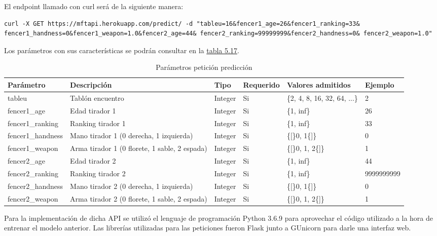 El endpoint llamado con curl será de la siguiente manera:

\begin{lstlisting}
curl -X GET https://mftapi.herokuapp.com/predict/ -d "tableu=16&fencer1_age=26&fencer1_ranking=33& fencer1_handness=0&fencer1_weapon=1.0&fencer2_age=44& fencer2_ranking=99999999&fencer2_handness=0& fencer2_weapon=1.0"
\end{lstlisting}

Los parámetros con sus características se podrán consultar en la \hyperref[tab:Parmetros peticion prediccion]{tabla 5.17}.


\begin{longtable}{llllll}
	\caption{Parámetros petición predicción}
	\label{tab:Parmetros peticion prediccion}

  \endfirsthead
  \endhead
  Parámetro & Descripción & Tipo & Requerido & Valores admitidos & Ejemplo \\ \hline
  \multicolumn{1}{l|}{tableu} & \multicolumn{1}{l|}{Tablón encuentro} & Integer & Si & \{2, 4, 8, 16, 32, 64, ...\} & 2 \\ \hline
  \multicolumn{1}{l|}{fencer1\_age} & \multicolumn{1}{l|}{Edad tirador 1} & Integer & Si & \{1, inf\} & 26 \\
  \multicolumn{1}{l|}{fencer1\_ranking} & \multicolumn{1}{l|}{Ranking tirador 1} & Integer & Si & \{1, inf\} & 33 \\
  \multicolumn{1}{l|}{fencer1\_handness} & \multicolumn{1}{l|}{Mano tirador 1 (0 derecha, 1 izquierda)} & Integer & Si & \{{[}\}0, 1\{{]}\} & 0 \\
  \multicolumn{1}{l|}{fencer1\_weapon} & \multicolumn{1}{l|}{Arma tirador 1 (0 florete, 1 sable, 2 espada)} & Integer & Si & \{{[}\}0, 1, 2\{{]}\} & 1 \\ \hline
  \multicolumn{1}{l|}{fencer2\_age} & \multicolumn{1}{l|}{Edad tirador 2} & Integer & Si & \{1, inf\} & 44 \\
  \multicolumn{1}{l|}{fencer2\_ranking} & \multicolumn{1}{l|}{Ranking tirador 2} & Integer & Si & \{1, inf\} & 9999999999 \\
  \multicolumn{1}{l|}{fencer2\_handness} & \multicolumn{1}{l|}{Mano tirador 2 (0 derecha, 1 izquierda)} & Integer & Si & \{{[}\}0, 1\{{]}\} & 0 \\
  \multicolumn{1}{l|}{fencer2\_weapon} & \multicolumn{1}{l|}{Arma tirador 2 (0 florete, 1 sable, 2 espada)} & Integer & Si & \{{[}\}0, 1, 2\{{]}\} & 1
\end{longtable}

Para la implementación de dicha API se utilizó el lenguaje de programación Python 3.6.9 para
aprovechar el código utilizado a la hora de entrenar el modelo anterior. Las librerías
utilizadas para las peticiones fueron Flask junto a GUnicorn para darle una interfaz web.


